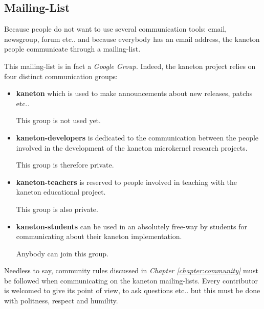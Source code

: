 %
%
%
%
%
%

%
%

\subsection{Mailing-List}
\label{section:mailing-list}

Because people do not want to use several communication tools: email,
newsgroup, forum etc.. and because everybody has an email address, the
kaneton people communicate through a mailing-list.

This mailing-list is in fact a \textit{Google Group}. Indeed, the kaneton
project relies on four distinct communication groups:

\begin{itemize}
  \item
    \textbf{kaneton} which is used to make announcements about new releases,
    patchs etc..

    \-

    This group is not used yet.
  \item
    \textbf{kaneton-developers} is dedicated to the communication between the
    people involved in the development of the kaneton microkernel research
    projects.

    \-

    This group is therefore private.
  \item
    \textbf{kaneton-teachers} is reserved to people involved in teaching
    with the kaneton educational project.

    \-

    This group is also private.
  \item
    \textbf{kaneton-students} can be used in an absolutely free-way by
    students for communicating about their kaneton implementation.

    \-

    Anybody can join this group.
\end{itemize}

Needless to say, community rules discussed in \textit{Chapter
\ref{chapter:community}} must be followed when communicating on the kaneton
mailing-lists. Every contributor is welcomed to give its point of view, to
ask questions etc.. but this must be done with politness, respect and humility.

